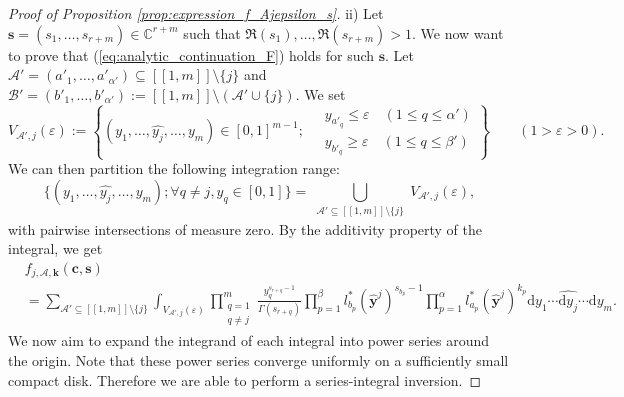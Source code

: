 \documentclass[a4paper]{amsart}
\theoremstyle{remark}
\theoremstyle{definition}
\newcommand{\dd}{\mathrm{d}}
\begin{document}
\begin{proof}[Proof of Proposition \ref{prop:expression_f_Ajepsilon_s}]
ii) Let $\mathbf{s}=(s_1,\ldots,s_{r+m}) \in \mathbb{C}^{r+m}$ such that $\Re(s_1),\ldots,\Re(s_{r+m})>1$. We now want to prove that (\ref{eq:analytic_continuation_F}) holds for such $\mathbf{s}$. Let $\mathcal{A}'=(a'_1,\ldots,a'_{\alpha'}) \subseteq [\![ 1,m ]\!] \setminus \{ j \}$ and $\mathcal{B}'=(b'_1,\ldots,b'_{\alpha'}) := [\![ 1,m ]\!] \setminus ( \mathcal{A}' \cup \{ j \})$. We set
\[
    V_{\mathcal{A}',j}(\varepsilon):= \left\{ (y_1,\ldots,\widehat{y_{j}},\ldots,y_{m}) \in [0,1]^{m-1} ; \
    \begin{aligned} 
        &y_{a'_q} \leq \varepsilon \quad (1 \leq q \leq \alpha') \\
        &y_{b'_q} \geq \varepsilon \quad (1 \leq q \leq \beta')
    \end{aligned}
    \right\} \qquad (1>\varepsilon>0). 
\]
We can then partition the following integration range:
$$ \{ (y_1,\ldots,\widehat{y_j},\ldots,y_{m}); \forall q \neq j, y_q \in [0,1] \} = \bigcup_{\substack{\mathcal{A}' \subseteq [\![1,m]\!] \setminus \{ j \}}} V_{\mathcal{A}',j}(\varepsilon), $$
with pairwise intersections of measure zero. By the additivity property of the integral, we get
\begin{align}
    &f_{j,\mathcal{A},\mathbf{k}}(\mathbf{c},\mathbf{s}) \nonumber \\
    &= \sum_{\mathcal{A}' \subseteq [\![1,m]\!] \setminus \{ j \}} \int_{V_{\mathcal{A}',j}(\varepsilon)} \prod_{\substack{q=1 \\ q \neq j}}^{m} \frac{y_q^{s_{r+q}-1}}{\Gamma(s_{r+q})} \prod_{p=1}^{\beta} l^*_{b_p}(\widehat{\mathbf{y}}^j)^{s_{b_p}-1} \prod_{p=1}^{\alpha} l^*_{a_p}(\widehat{\mathbf{y}}^j)^{k_p} \dd y_1 \cdots \widehat{\dd y_{j}} \cdots \dd y_{m}. \label{eq:expression_chasles_f_Ajepsilon_(s)}
\end{align}
We now aim to expand the integrand of each integral into power series around the origin. Note that these power series converge uniformly on a sufficiently small compact disk. Therefore we are able to perform a series-integral inversion.


\end{proof}
\end{document}

